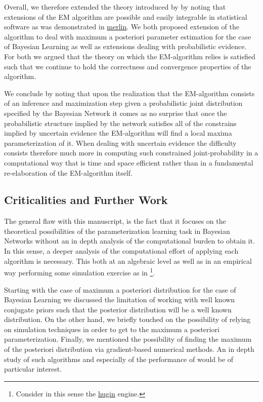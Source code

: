 \documentclass[11pt]{article}
\begin{document}
\begin{article}
Overall, we therefore extended the theory introduced by
\cite{Wasserkrug_all} by noting that extensions of the EM algorithm
are possible and easily integrable in statistical software as was
demonstrated in \href{https://github.com/radum2275/merlin}{merlin}. We both proposed extension of the algorithm
to deal with maximum a posteriori parameter estimation for the case
of Bayesian Learning as well as extensions dealing with
probabilistic evidence. For both we argued that the theory on which
the EM-algorithm relies is satisfied such that we continue to hold
the correctness and convergence properties of the algorithm.

We conclude by noting that upon the realization that the
EM-algorithm consists of an inference and maximization step given a probabilistic
joint distribution specified by the Bayesian Network it comes as no
surprise that once the probabilistic structure implied by the
network satisfies all of the constrains implied by uncertain
evidence the EM-algorithm will find a local maxima parameterization
of it. When dealing with uncertain evidence the difficulty consists
therefore much more in computing such constrained joint-probability
in a computational way that is time and space efficient rather than
in a fundamental re-elaboration of the EM-algorithm itself.

\subsection{Criticalities and Further Work}
\label{sec:orgdd7020b}

The general flaw with this manuscript, is the fact that it focuses
on the theoretical possibilities of the parameterization learning
task in Bayesian Networks without an in depth analysis of the
computational burden to obtain it. In this sense, a deeper analysis
of the computational effort of applying each algorithm is
necessary. This both at an algebraic level as well as in an
empirical way performing some simulation exercise as in
\cite{Wasserkrug_all}\footnote{Consider in this sense the \href{https://www.hugin.com/}{hugin} engine.}.  

Starting with the case of maximum a posteriori distribution for the
case of Bayesian Learning we discussed the limitation of working
with well known conjugate priors such that the posterior
distribution will be a well known distribution. On the other hand,
we briefly touched on the possibility of relying on simulation
techniques in order to get to the maximum a posteriori
parameterization. Finally, we mentioned the possibility of finding
the maximum of the posteriori distribution via gradient-based
numerical methods. An in depth study of such algorithms and
especially of the performance of \cite{meng2016method} would be of
particular interest. 


\end{article}
\end{document}
